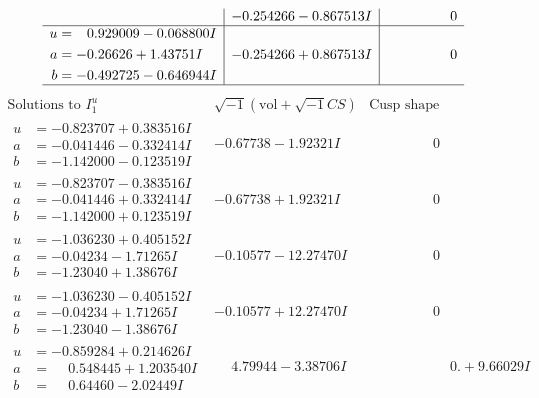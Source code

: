 \documentclass[1p]{elsarticle_modified}
\theoremstyle{definition}
\newcommand{\I}{\sqrt{-1}}
\begin{document}
$$\begin{array}{c|c|c}
 & -0.254266 - 0.867513 I & \phantom{-0.000000 } 0 \\ \hline\begin{aligned}
u &= \phantom{-}0.929009 - 0.068800 I \\
a &= -0.26626 + 1.43751 I \\
b &= -0.492725 - 0.646944 I\end{aligned}
 & -0.254266 + 0.867513 I & \phantom{-0.000000 } 0\\
 \hline 
 \end{array}$$\newpage$$\begin{array}{c|c|c}  
\text{Solutions to }I^u_{1}& \I (\text{vol} + \sqrt{-1}CS) & \text{Cusp shape}\\
 \hline 
\begin{aligned}
u &= -0.823707 + 0.383516 I \\
a &= -0.041446 - 0.332414 I \\
b &= -1.142000 - 0.123519 I\end{aligned}
 & -0.67738 - 1.92321 I & \phantom{-0.000000 } 0 \\ \hline\begin{aligned}
u &= -0.823707 - 0.383516 I \\
a &= -0.041446 + 0.332414 I \\
b &= -1.142000 + 0.123519 I\end{aligned}
 & -0.67738 + 1.92321 I & \phantom{-0.000000 } 0 \\ \hline\begin{aligned}
u &= -1.036230 + 0.405152 I \\
a &= -0.04234 - 1.71265 I \\
b &= -1.23040 + 1.38676 I\end{aligned}
 & -0.10577 - 12.27470 I & \phantom{-0.000000 } 0 \\ \hline\begin{aligned}
u &= -1.036230 - 0.405152 I \\
a &= -0.04234 + 1.71265 I \\
b &= -1.23040 - 1.38676 I\end{aligned}
 & -0.10577 + 12.27470 I & \phantom{-0.000000 } 0 \\ \hline\begin{aligned}
u &= -0.859284 + 0.214626 I \\
a &= \phantom{-}0.548445 + 1.203540 I \\
b &= \phantom{-}0.64460 - 2.02449 I\end{aligned}
 & \phantom{-}4.79944 - 3.38706 I & \phantom{-0.000000 -}0. + 9.66029 I \\ \hline\begin{aligned}

\end{aligned}
\end{array}$$
\end{document}
